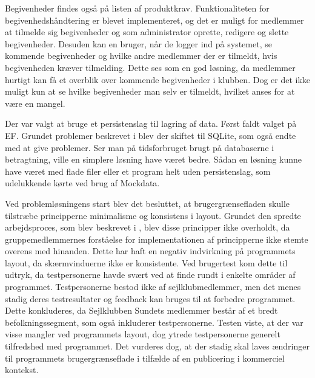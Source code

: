 Begivenheder findes også på listen af produktkrav.
Funktionaliteten for begivenhedshåndtering er blevet implementeret, og det er muligt for medlemmer at tilmelde sig begivenheder og som administrator oprette, redigere og slette begivenheder. 
Desuden kan en bruger, når de logger ind på systemet, se kommende begivenheder og hvilke andre medlemmer der er tilmeldt, hvis begivenheden kræver tilmelding. 
Dette ses som en god løsning, da medlemmer hurtigt kan få et overblik over kommende begivenheder i klubben.
Dog er det ikke muligt kun at se hvilke begivenheder man selv er tilmeldt, hvilket anses for at være en mangel. 

Der var valgt at bruge et persistenslag til lagring af data. 
Først faldt valget på \acl{EF}. 
Grundet problemer beskrevet i  blev der skiftet til SQLite, som også endte med at give problemer. 
Ser man på tidsforbruget brugt på databaserne i betragtning, ville en simplere løsning have været bedre.
Sådan en løsning kunne have været med flade filer eller et program helt uden persistenslag, som udelukkende kørte ved brug af Mockdata.  

Ved problemløsningens start blev det besluttet, at brugergrænsefladen skulle tilstræbe principperne minimalisme og konsistens i layout.
Grundet den spredte arbejdsproces, som blev beskrevet i , blev disse principper ikke overholdt, da gruppemedlemmernes forståelse for implementationen af principperne ikke stemte overens med hinanden.
Dette har haft en negativ indvirkning på programmets layout, da skærmvinduerne ikke er konsistente.
Ved brugertest kom dette til udtryk, da testpersonerne havde svært ved at finde rundt i enkelte områder af programmet. 
Testpersonerne bestod ikke af sejlklubmedlemmer, men det menes stadig deres testresultater og feedback kan bruges til at forbedre programmet.
Dette konkluderes, da Sejlklubben Sundets medlemmer består af et bredt befolkningssegment, som også inkluderer testpersonerne.
Testen viste, at der var visse mangler ved programmets layout, dog ytrede testpersonerne generelt tilfredshed med programmet.
Det vurderes dog, at der stadig skal laves ændringer til programmets brugergrænseflade i tilfælde af en publicering i kommerciel kontekst. 


